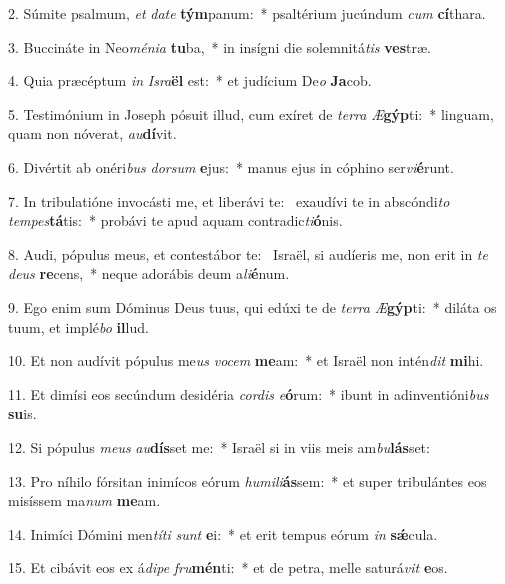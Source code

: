 2. Súmite psalmum, \textit{et} \textit{da}\textit{te} \textbf{tým}panum:~*  psaltérium jucúndum \textit{cum} \textbf{cí}thara.\

3. Buccináte in Neo\textit{mé}\textit{ni}\textit{a} \textbf{tu}ba,~*  in insígni die solemnitá\textit{tis} \textbf{ves}træ.\

4. Quia præcéptum \textit{in} \textit{Is}\textit{ra}\textbf{ël} est:~*  et judícium De\textit{o} \textbf{Ja}cob.\

5. Testimónium in Joseph pósuit illud, cum exíret de \textit{ter}\textit{ra} \textit{Æ}\textbf{gýp}ti:~*  linguam, quam non nóverat, \textit{au}\textbf{dí}vit.\

6. Divértit ab onéri\textit{bus} \textit{dor}\textit{sum} \textbf{e}jus:~*  manus ejus in cóphino ser\textit{vi}\textbf{é}runt.\

7. In tribulatióne invocásti me, et liberávi te: \dag\  exaudívi te in abscóndi\textit{to} \textit{tem}\textit{pes}\textbf{tá}tis:~*  probávi te apud aquam contradic\textit{ti}\textbf{ó}nis.\

8. Audi, pópulus meus, et contestábor te: \dag\  Israël, si audíeris me, non erit in \textit{te} \textit{de}\textit{us} \textbf{re}cens,~*  neque adorábis deum a\textit{li}\textbf{é}num.\

9. Ego enim sum Dóminus Deus tuus, qui edúxi te de \textit{ter}\textit{ra} \textit{Æ}\textbf{gýp}ti:~*  diláta os tuum, et implé\textit{bo} \textbf{il}lud.\

10. Et non audívit pópulus me\textit{us} \textit{vo}\textit{cem} \textbf{me}am:~*  et Israël non intén\textit{dit} \textbf{mi}hi.\

11. Et dimísi eos secúndum desidéria \textit{cor}\textit{dis} \textit{e}\textbf{ó}rum:~*  ibunt in adinventióni\textit{bus} \textbf{su}is.\

12. Si pópulus \textit{me}\textit{us} \textit{au}\textbf{dís}set me:~*  Israël si in viis meis am\textit{bu}\textbf{lás}set:\

13. Pro níhilo fórsitan inimícos eórum \textit{hu}\textit{mi}\textit{li}\textbf{ás}sem:~*  et super tribulántes eos misíssem ma\textit{num} \textbf{me}am.\

14. Inimíci Dómini men\textit{tí}\textit{ti} \textit{sunt} \textbf{e}i:~*  et erit tempus eórum \textit{in} \textbf{sǽ}cula.\

15. Et cibávit eos ex á\textit{di}\textit{pe} \textit{fru}\textbf{mén}ti:~*  et de petra, melle saturá\textit{vit} \textbf{e}os.\


